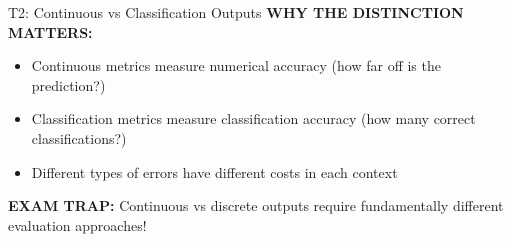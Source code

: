 \documentclass[8pt]{beamer}
\begin{document}
\begin{frame}{T2: Continuous vs Classification Outputs}
		\vspace{0.1cm}
		\textbf{WHY THE DISTINCTION MATTERS:}
		\begin{itemize}
			\item Continuous metrics measure numerical accuracy (how far off is the prediction?)
			\item Classification metrics measure classification accuracy (how many correct classifications?)
			\item Different types of errors have different costs in each context
		\end{itemize}
		
		\textcolor{myred}{\textbf{EXAM TRAP:}} \textcolor{myblue}{Continuous vs discrete} outputs require fundamentally different evaluation approaches!
	\end{frame}
	
\end{document}
